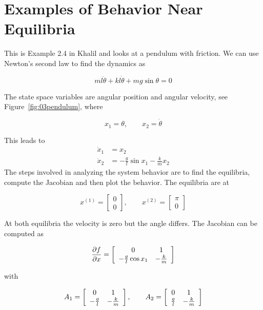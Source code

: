 \section{Examples of Behavior Near Equilibria}
\begin{example}%
\label{ex:03pendulum}
This is Example 2.4 in Khalil and looks at a pendulum with friction.
We can use Newton's second law to find the dynamics as

\begin{equation*}
ml\ddot{\theta} + kl\dot{\theta} + mg\sin\theta = 0
\end{equation*}

The state space variables are angular position and angular velocity, see Figure~\ref{fig:03pendulum}, where

\begin{equation*}
x_1 = \theta, \qquad x_2 = \dot{\theta}
\end{equation*}

This leads to
\begin{align*}
\dot{x}_1 &= x_2 \\
\dot{x}_2 &= -\tfrac{g}{l}\sin x_1 - \tfrac{k}{m}x_2
\end{align*}
The steps involved in analyzing the system behavior are to find the equilibria, compute the Jacobian and then plot the behavior.
The equilibria are at

\begin{equation*}
x^{(1)} = \left[\begin{array}{c} 0 \\ 0 \end{array}\right], \qquad x^{(2)} = \left[\begin{array}{c} \pi \\ 0 \end{array}\right]
\end{equation*}

At both equilibria the velocity is zero but the angle differs.
The Jacobian can be computed as

\begin{equation*}
\frac{\partial{} f}{\partial{} x} = \left[\begin{array}{c c} 0 & 1 \\ -\tfrac{g}{l}\cos x_1 & -\tfrac{k}{m} \end{array}\right]
\end{equation*}

with

\begin{equation*}
A_1 = \left[\begin{array}{c c} 0 & 1 \\ -\tfrac{g}{l} & -\tfrac{k}{m} \end{array}\right], \qquad A_2 = \left[\begin{array}{c c} 0 & 1 \\ \tfrac{g}{l} & -\tfrac{k}{m} \end{array}\right]
\end{equation*}


\end{example}
